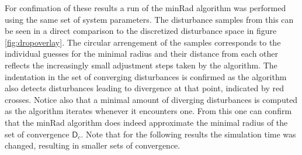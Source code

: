     For confimation of these results a run of the minRad algorithm was performed using the same set of system parameters. The disturbance samples from this can be seen in a direct comparison to the discretized disturbance space in figure \ref{fig:dropoverlay}. The circular arrengement of the samples corresponds to the individual guesses for the minimal radius and their distance from each other reflects the increasingly small adjustment steps taken by the algorithm. The indentation in the set of converging disturbances is confirmed as the algorithm also detects disturbances leading to divergence at that point, indicated by red crosses. Notice also that a minimal amount of diverging disturbances is computed as the algorithm iterates whenever it encounters one. From this one can confirm that the minRad algorithm does indeed approximate the minimal radius of the set of convergence $\mathsf{D}_c$. Note that for the following results the simulation time was changed, resulting in smaller sets of convergence. 

